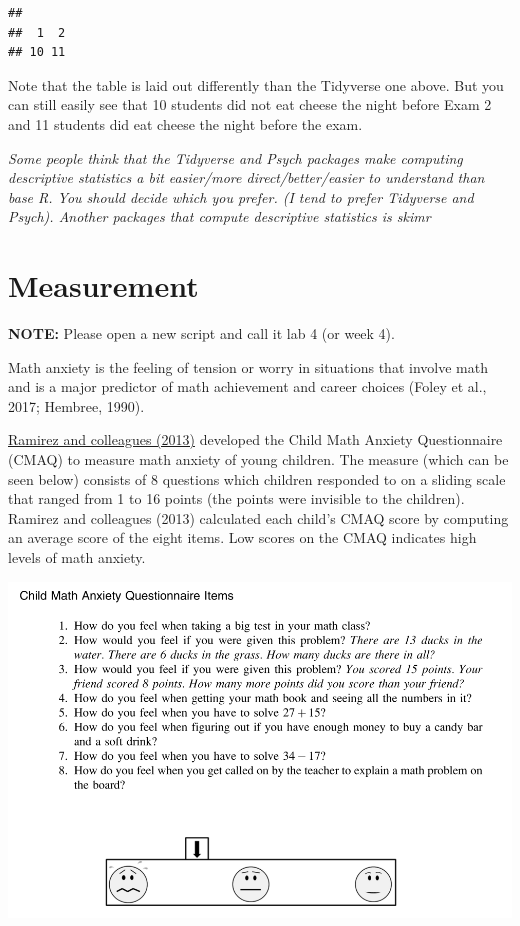 \documentclass[
]{book}
\begin{document}
\begin{verbatim}
## 
##  1  2 
## 10 11
\end{verbatim}

Note that the table is laid out differently than the Tidyverse one above. But you can still easily see that 10 students did not eat cheese the night before Exam 2 and 11 students did eat cheese the night before the exam.

\emph{Some people think that the Tidyverse and Psych packages make computing descriptive statistics a bit easier/more direct/better/easier to understand than base R. You should decide which you prefer. (I tend to prefer Tidyverse and Psych). Another packages that compute descriptive statistics is skimr }

\hypertarget{measurement}{%
\chapter{Measurement}\label{measurement}}

\textbf{NOTE:} Please open a new script and call it lab 4 (or week 4).

Math anxiety is the feeling of tension or worry in situations that involve math and is a major predictor of math achievement and career choices (Foley et al., 2017; Hembree, 1990).

\href{https://drive.google.com/file/d/1VvSqWL7W4mvA5MtDAF94GclVIemC_a9P/view?usp=sharing}{Ramirez and colleagues (2013)} developed the Child Math Anxiety Questionnaire (CMAQ) to measure math anxiety of young children. The measure (which can be seen below) consists of 8 questions which children responded to on a sliding scale that ranged from 1 to 16 points (the points were invisible to the children). Ramirez and colleagues (2013) calculated each child's CMAQ score by computing an average score of the eight items. Low scores on the CMAQ indicates high levels of math anxiety.

\includegraphics{img/cmaq.png}
\end{document}
